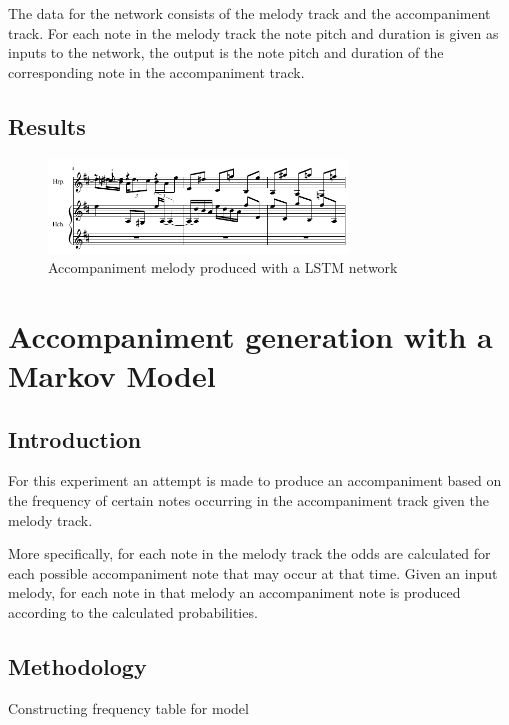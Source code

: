 The data for the network consists of the melody track and the accompaniment track. For each note in the melody track the note pitch and duration is given as inputs to the network, the output is the note pitch and duration of the corresponding note in the accompaniment track.

\section{Results}
\begin{figure}
\centerline{\includegraphics[width=300px]{../images/ann_ff_accomp.pdf}}
\caption{Accompaniment melody produced with a \ac{LSTM} network}
\label{ims:lstmaccomp}
\end{figure}

\chapter{Accompaniment generation with a Markov Model}
\section{Introduction}
For this experiment an attempt is made to produce an accompaniment based on the frequency of certain notes occurring in the accompaniment track given the melody track.

More specifically, for each note in the melody track the odds are calculated for each possible accompaniment note that may occur at that time. Given an input melody, for each note in that melody an accompaniment note is produced according to the calculated probabilities.

\section{Methodology}
\begin{algorithm}
 \caption{Constructing frequency table for model}
\end{algorithm}


